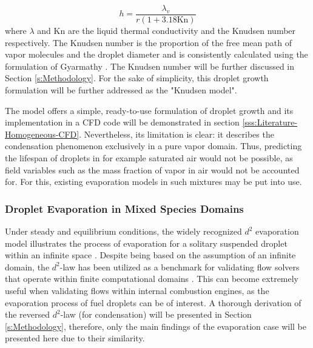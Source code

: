 \documentclass[12pt]{article}
\numberwithin{equation}{section}
\begin{document}
\begin{equation}\label{eq:knudsen convection coeff}
    h=\frac{\lambda_{v}}{r(1+3.18\textrm{Kn})}
\end{equation}
\noindent
where $\lambda$ and \textrm{Kn} are the liquid thermal conductivity and the Knudsen number respectively. The Knudsen number is the proportion of the free mean path of vapor molecules and the droplet diameter and is consistently calculated using the formulation of Gyarmathy \cite{gyarmathy1962grundlagen}. The Knudsen number will be further discussed in Section \ref{s:Methodology}. For the sake of simplicity, this droplet growth formulation will be further addressed as the "Knudsen model".

The model offers a simple, ready-to-use formulation of droplet growth and its implementation in a CFD code will be demonstrated in section \ref{sss:Literature-Homogeneous-CFD}. Nevertheless, its limitation is clear: it describes the condensation phenomenon exclusively in a pure vapor domain. Thus, predicting the lifespan of droplets in for example saturated air would not be possible, as field variables such as the mass fraction of vapor in air would not be accounted for. For this, existing evaporation models in such mixtures may be put into use.
\subsubsection{Droplet Evaporation in Mixed Species Domains}\label{sss:Literature-Droplet evaporation}
Under steady and equilibrium conditions, the widely recognized $d^{2}$ evaporation model illustrates the process of evaporation for a solitary suspended droplet within an infinite space \cite{turns2011introduction}. Despite being based on the assumption of an infinite domain, the $d^{2}$-law has been utilized as a benchmark for validating flow solvers that operate within finite computational domains \cite{pathak2018steady}. This can become extremely useful when validating flows within internal combustion engines, as the evaporation process of fuel droplets can be of interest. A thorough derivation of the reversed $d^2$-law (for condensation) will be presented in Section \ref{s:Methodology}, therefore, only the main findings of the evaporation case will be presented here due to their similarity.
\end{document}
